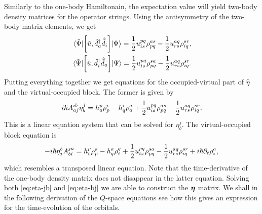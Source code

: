            Similarly to the one-body Hamiltonain, the expectation value will
            yield two-body density matrices for the operator strings.
            Using the antisymmetry of the two-body matrix elements, we get
            \begin{gather}
                \mel*{\tilde{\Psi}}{
                    \left[
                        \hat{u}
                    , 
                        \hat{d}^{\dagger}_{a}
                        \hat{\tilde{d}}_{i}
                    \right]
                }{\Psi}
                =
                \frac{1}{2}u^{pq}_{is}\rho^{as}_{pq}
                - \frac{1}{2}u^{aq}_{rs}\rho^{sr}_{iq},
                \\
                \mel*{\tilde{\Psi}}{
                    \left[
                        \hat{u}
                    , 
                        \hat{d}^{\dagger}_{i}
                        \hat{\tilde{d}}_{a}
                    \right]
                }{\Psi}
                =
                \frac{1}{2}
                u^{pq}_{is}\rho^{sa}_{pq}
                -
                \frac{1}{2}
                u^{aq}_{rs}\rho^{sr}_{iq}.
            \end{gather}
            Putting everything together we get equations for the
            occupied-virtual part of $\hat{\eta}$ and the virtual-occupied
            block.
            The former is given by
            \begin{align}
                i\hslash A^{ib}_{aj}\eta^{j}_{b}
                = h^{p}_{a}\rho^{i}_{p}
                - h^{i}_{q}\rho^{q}_{a}
                + \frac{1}{2}u^{pq}_{is}\rho^{as}_{pq}
                - \frac{1}{2}u^{aq}_{rs}\rho^{sr}_{iq}.
                \label{eq:eta-jb}
            \end{align}
            This is a linear equation system that can be solved for
            $\eta^{j}_{b}$.
            The virtual-occupied block equation is
            \begin{align}
                -i\hslash\eta^{b}_{j}
                A^{ja}_{bi}
                =
                h^{p}_{i}\rho^{a}_{p}
                -
                h^{a}_{q}\rho^{q}_{i}
                +
                \frac{1}{2}
                u^{pq}_{is}\rho^{sa}_{pq}
                -
                \frac{1}{2}
                u^{aq}_{rs}\rho^{sr}_{iq}
                + i\hslash\partial_t\rho^{a}_{i},
                \label{eq:eta-bj}
            \end{align}
            which resembles a transposed linear equation.
            Note that the time-derivative of the one-body density matrix does
            not disappear in the latter equation.
            Solving both \autoref{eq:eta-jb} and \autoref{eq:eta-bj} we are able
            to construct the $\boldsymbol{\eta}$ matrix.
            We shall in the following derivation of the $Q$-space equations see
            how this gives an expression for the time-evolution of the orbitals.

